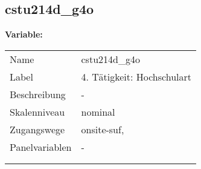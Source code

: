 	
	
	\subsection{cstu214d\_g4o}
	\label{subSection:cstu214d_g4o}

	\noindent\textbf{Variable:}\\
		\begin{tabular}{lL{11.3cm}}
			\label{tableVariable:cstu214d_g4o}
			Name & cstu214d\_g4o \\
			Label & 4. Tätigkeit: Hochschulart \\
			Beschreibung & - \\
			Skalenniveau & nominal \\
			Zugangswege &
				onsite-suf,
 \\
			Panelvariablen & -
			 \\
			 \\
 \\
		\end{tabular}






